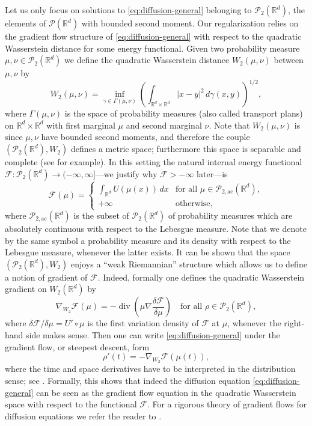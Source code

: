 \documentclass[11pt,leqno]{amsart}
\theoremstyle{definition}
\newcommand{\be}{\begin{equation}}
\newcommand{\ee}{\end{equation}}
\newcommand{\bes}{\begin{equation*}}
\newcommand{\ees}{\end{equation*}}
\newcommand{\R}{{\mathord{\mathbb R}}}
\newcommand{\grad}{\nabla}
\newcommand{\F}{\mathcal{F}}
\def\P{{\mathcal P}}
\def\Pac{\mathcal{P}_{\mathrm{2,ac}}}
\def\F{\mathcal{F}}
\DeclareMathOperator{\dive}{div}
\begin{document}
Let us only focus on solutions to \eqref{eq:diffusion-general} belonging to $\P_2(\R^d)$, the elements of $\P(\R^d)$ with bounded second moment. Our regularization relies on the gradient flow structure of \eqref{eq:diffusion-general} with respect to the quadratic Wasserstein distance for some energy functional. Given two probability measure $\mu,\nu\in \P_2(\R^d)$ we define the quadratic Wasserstein distance $W_2(\mu,\nu)$ between $\mu,\nu$ by
\be \label{eq:2-wasserstein}
	W_2(\mu,\nu) = \inf_{\gamma \in \Gamma(\mu,\nu)} \left( \int_{\R^d \times \R^d} |x-y|^2 \,d\gamma(x,y)\right)^{1/2},
\ee
where $\Gamma(\mu,\nu)$ is the space of probability measures (also called transport plans) on $\R^d\times\R^d$ with first marginal $\mu$ and second marginal $\nu$. Note that $W_2(\mu,\nu)$ is since $\mu,\nu$ have bounded second moments, and therefore the couple $(\P_2(\R^d),W_2)$ defines a metric space; furthermore this space is separable and complete (see \cite[Proposition 7.1.5]{AmGiSa} for example). In this setting the natural internal energy functional $\F \colon \P_2(\R^d) \to (-\infty,\infty]$---we justify why $\F>-\infty$ later---is
\be \label{eq:internal-energy}
	\F(\mu) = \begin{cases}
		\displaystyle \int_{\R^d} U(\mu(x)) \,d x & \mbox{for all $\mu \in \Pac(\R^d)$},\\
		+\infty & \mbox{otherwise},
	\end{cases}
\ee
where $\Pac(\R^d)$ is the subset of $\P_2(\R^d)$ of probability measures which are absolutely continuous with respect to the Lebesgue measure. Note that we denote by the same symbol a probability measure and its density with respect to the Lebesgue measure, whenever the latter exists. It can be shown that the space $(\P_2(\R^d),W_2)$ enjoys a ``weak Riemannian'' structure which allows us to define a notion of gradient of $\F$. Indeed, formally one defines the quadratic Wasserstein gradient on $W_2(\R^d)$ by
\bes
	\grad_{W_2} \F(\mu) = -\dive \left(\mu \grad \frac{\delta \F}{\delta \mu}\right) \quad \mbox{for all $\rho \in \P_{2}(\R^d)$},
\ees
where $\delta \F/\delta \mu = U'\circ\mu$ is the first variation density of $\F$ at $\mu$, whenever the right-hand side makes sense. Then one can write \eqref{eq:diffusion-general} under the gradient flow, or steepest descent, form
\bes
	\rho'(t) = - \grad_{W_2} \F(\mu(t)),
\ees
where the time and space derivatives have to be interpreted in the distribution sense; see \cite[Equation (8.3.8)]{AmGiSa}. Formally, this shows that indeed the diffusion equation \eqref{eq:diffusion-general} can be seen as the gradient flow equation in the quadratic Wasserstein space with respect to the functional $\F$. For a rigorous theory of gradient flows for diffusion equations we refer the reader to \cite{JoKiOt,Villani,Villani2,AmGiSa,AmGi,AmSa,Santambrogio}.
\end{document}
